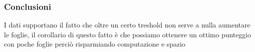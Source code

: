\documentclass[11pt]{article}
\begin{document}
    \subsubsection{Conclusioni}\label{conclusioni}

I dati supportano il fatto che oltre un certo treshold non serve a nulla
aumentare le foglie, il corollario di questo fatto è che possiamo
ottenere un ottimo punteggio con poche foglie perciò risparmiando
computazione e spazio


    
    
    
    
\end{document}
